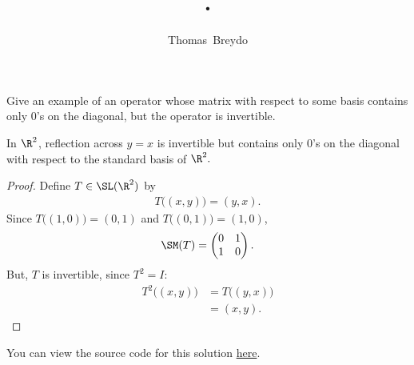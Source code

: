 \documentclass{amsart}
\title{\pagenum.\probnum}
\author{Thomas\ Breydo}
\newcommand{\pagenum}{154}
\newcommand{\probnum}{14}
\begin{document}
\maketitle

\begin{problem*}
Give an example of an operator whose matrix with respect to some basis
contains only $0$'s on the diagonal, but the operator is invertible.
\end{problem*}

\vspace{0.5in}

\begin{claim*}
    In $\R^2$, reflection across $y=x$ is invertible but contains
    only $0$'s on the diagonal with respect to the standard basis
    of $\R^2.$
\end{claim*}
\begin{proof}
Define $T\in\SL(\R^2)$ by
\begin{align*}
    T\big((x, y)\big)=(y,x).
\end{align*}
Since $T\big((1,0)\big)=(0,1)$ and $T\big((0,1)\big)=(1,0)$,
\begin{align*}
    \SM(T)=\begin{pmatrix}
        0 & 1 \\
        1 & 0
    \end{pmatrix}.
\end{align*}
But, $T$ is invertible, since $T^2=I$:
\begin{align*}
    T^2\big((x,y)\big)&=T\big((y,x)\big)\\
                      &=(x,y).
\end{align*}
\end{proof}

\vspace{0.5in}

\begin{note*}
You can view the source code for this solution
\href{https://github.com/thomasbreydo/linalg/blob/main/\pagenum_\probnum_Thomas_Breydo.tex}
{here}.
\end{note*}
\end{document}
